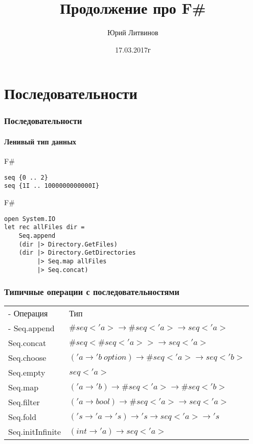 \documentclass[xetex,mathserif,serif]{beamer}
\title{Продолжение про F\#}
\author{Юрий Литвинов}
\date{17.03.2017г}
\begin{document}
	
	\frame{\titlepage}

	\section{Последовательности}
	
	\begin{frame}[fragile]
		\frametitle{Последовательности}
		\framesubtitle{Ленивый тип данных}
		\begin{exampleblock}{F\#}
			\begin{verbatim}
seq {0 .. 2}
seq {1I .. 1000000000000I}
			\end{verbatim}
		\end{exampleblock}

		\begin{exampleblock}{F\#}
			\begin{verbatim}
open System.IO
let rec allFiles dir =
    Seq.append
    (dir |> Directory.GetFiles)
    (dir |> Directory.GetDirectories 
         |> Seq.map allFiles 
         |> Seq.concat)
			\end{verbatim}
		\end{exampleblock}
\end{frame}

	\begin{frame}
		\frametitle{Типичные операции с последовательностями}
		\begin{small}
			\begin{tabu} {| X[0.5 l p] | X[1 l p] |}
				\tabucline-
				Операция                               & Тип                    \\
				\tabucline-
				\everyrow{\tabucline-}
				Seq.append                    & $\#seq<'a> \to \#seq<'a> \to seq<'a>$ \\
				Seq.concat                    & $\#seq<\#seq<'a>> \to seq<'a>$ \\
				Seq.choose                    & $('a \to 'b\ option) \to \#seq<'a> \to seq<'b>$ \\
				Seq.empty                     & $seq<'a>$ \\
				Seq.map                       & $('a \to 'b) \to \#seq<'a> \to \#seq<'b>$ \\
				Seq.filter                    & $('a \to bool) \to \#seq<'a> \to seq<'a>$ \\
				Seq.fold                      & $('s \to 'a \to 's) \to 's \to seq<'a> \to 's$ \\
				Seq.initInfinite              & $(int \to 'a) \to seq<'a>$ \\
			\end{tabu}
		\end{small}
	\end{frame}
\end{document}
